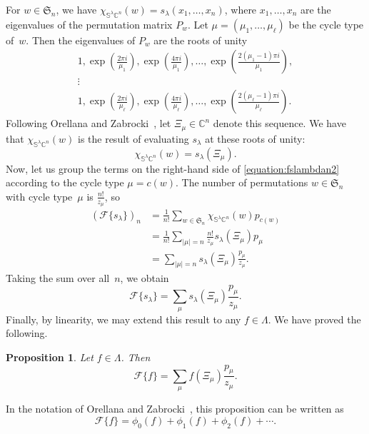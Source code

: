 \documentclass[11pt]{article}
\newtheorem{prop}[theo]{Proposition}
\theoremstyle{definition}
\numberwithin{equation}{section}
\newcommand{\K}{\mathbb{C}}
\newcommand{\F}[1]{\mathscr{F}\{#1\}}
\newcommand{\Sym}{\mathfrak{S}}
\begin{document}
For $w \in \Sym_n$, we have $\chi_{\mathbb{S}^\lambda \K^n}(w) = s_\lambda(x_1, \ldots, x_n)$, where $x_1, \ldots, x_n$ are the eigenvalues of the permutation matrix $P_w$. Let $\mu = (\mu_1, \ldots, \mu_\ell)$ be the cycle type of~$w$. Then the eigenvalues of $P_w$ are the roots of unity
\begin{gather*}
    1, \exp\left(\frac{2 \pi i}{\mu_1}\right), \exp\left(\frac{4 \pi i}{\mu_1}\right), \ldots, \exp\left(\frac{2(\mu_1 - 1) \pi i}{\mu_1}\right), \\
    \vdots \\
    1, \exp\left(\frac{2 \pi i}{\mu_\ell}\right), \exp\left(\frac{4 \pi i}{\mu_\ell}\right), \ldots, \exp\left(\frac{2(\mu_\ell - 1) \pi i}{\mu_\ell}\right).
\end{gather*}
Following Orellana and Zabrocki~\cite{MR4275829, MR4295089}, let $\Xi_\mu \in \K^n$ denote this sequence. We have that $\chi_{\mathbb{S}^\lambda \K^n}(w)$ is the result of evaluating $s_\lambda$ at these roots of unity: \[\chi_{\mathbb{S}^\lambda \K^n}(w) =
s_\lambda\left(\Xi_\mu\right).\]
Now, let us group the terms on the right-hand side of \eqref{equation:fslambdan2} according to the cycle type $\mu = c(w)$. The number of permutations $w \in \Sym_n$ with cycle type~$\mu$ is $\frac{n!}{z_\mu}$, so 
\begin{align*}(\F{s_\lambda})_n &= \frac{1}{n!} \sum_{w \in \Sym_n} \chi_{\mathbb{S}^\lambda \K^n}(w) p_{c(w)} \\
&= \frac{1}{n!} \sum_{|\mu| = n} \frac{n!}{z_\mu}s_\lambda(\Xi_\mu)p_\mu \\
&= \sum_{|\mu| = n} s_\lambda(\Xi_\mu) \frac{p_\mu}{z_\mu}.\end{align*}
Taking the sum over all~$n$, we obtain \[\F{s_\lambda} = \sum_{\mu} s_\lambda(\Xi_\mu) \frac{p_\mu}{z_\mu}.\]
Finally, by linearity, we may extend this result to any $f \in \Lambda$. We have proved the following.
\begin{prop}\label{proposition:rootsofunityformula}
    Let $f \in \Lambda$. Then \[\F{f} = \sum_{\mu} f(\Xi_\mu) \frac{p_\mu}{z_\mu}.\]
\end{prop}
In the notation of Orellana and Zabrocki~\cite{MR4275829}, this proposition can be written as \[\F{f} = \phi_0(f) + \phi_1(f) + \phi_2(f) + \cdots.\]
\end{document}
